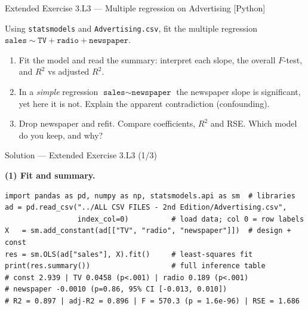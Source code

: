 \documentclass[aspectratio=169,11pt]{beamer}
\begin{document}
\begin{frame}[fragile]{Extended Exercise 3.L3 --- Multiple regression on Advertising [Python]}
  \begin{longexercise}
    Using \texttt{statsmodels} and \texttt{Advertising.csv}, fit the
    multiple regression
    $\texttt{sales}\sim\texttt{TV}+\texttt{radio}+\texttt{newspaper}$.
    \begin{enumerate}
      \item Fit the model and read the summary: interpret each slope, the
            overall $F$-test, and $R^2$ vs adjusted $R^2$.
      \item In a \emph{simple} regression $\texttt{sales}\sim\texttt{newspaper}$
            the newspaper slope is significant, yet here it is not.
            Explain the apparent contradiction (confounding).
      \item Drop newspaper and refit. Compare coefficients, $R^2$ and RSE.
            Which model do you keep, and why?
    \end{enumerate}
  \end{longexercise}
\end{frame}

\begin{frame}[fragile]{Solution --- Extended Exercise 3.L3 (1/3)}
  \begin{solutionbox}
    \textbf{(1) Fit and summary.}
\begin{lstlisting}
import pandas as pd, numpy as np, statsmodels.api as sm  # libraries
ad = pd.read_csv("../ALL CSV FILES - 2nd Edition/Advertising.csv",
                 index_col=0)          # load data; col 0 = row labels
X   = sm.add_constant(ad[["TV", "radio", "newspaper"]])  # design + const
res = sm.OLS(ad["sales"], X).fit()     # least-squares fit
print(res.summary())                   # full inference table
# const 2.939 | TV 0.0458 (p<.001) | radio 0.189 (p<.001)
# newspaper -0.0010 (p=0.86, 95% CI [-0.013, 0.010])
# R2 = 0.897 | adj-R2 = 0.896 | F = 570.3 (p = 1.6e-96) | RSE = 1.686
\end{lstlisting}
  \end{solutionbox}
\end{frame}
\end{document}
